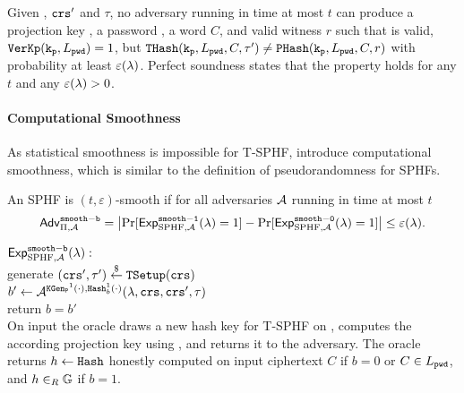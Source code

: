 \begin{definition}
Given \crs, $\mathtt{crs}'$ and $\tau$, no adversary running in time at most $t$ can produce a projection key \hp, a password \pwd, a word $C$, and valid witness $r$ such that \hp is valid, \ie $\mathtt{VerKp}(\mathtt{k_p},L_\mathtt{pwd})=1$, but $\mathtt{THash}(\mathtt{k_p},L_\mathtt{pwd},C,\tau')\not=\mathtt{PHash}(\mathtt{k_p},L_\mathtt{pwd},C,r)$ with probability at least $\varepsilon(\lambda)$.
Perfect soundness states that the property holds for any $t$ and any $\varepsilon(\lambda)>0$.
\eod
\end{definition} 

\paragraph{Computational Smoothness}
As statistical smoothness is impossible for \ac{T-SPHF}, \citet{Benhamouda2013} introduce computational smoothness, which is similar to the definition of pseudorandomness for \acp{SPHF}.

\begin{definition}
An \ac{SPHF} is $(t,\varepsilon)$-smooth if for all adversaries $\mathcal{A}$ running in time at most $t$
\[ \mathsf{Adv}_{\Pi, \mathcal{A}}^{\mathtt{smooth-b}} = \left|\Pr[\mathsf{Exp}^{\mathtt{smooth-1}}_{\text{SPHF},\mathcal{A}}(\lambda)=1] - \Pr[\mathsf{Exp}^{\mathtt{smooth-0}}_{\text{SPHF},\mathcal{A}}(\lambda)=1]\right| \leq \varepsilon(\lambda).\]

\noindent
$\mathsf{Exp}^{\mathtt{smooth-b}}_{\text{SPHF},\mathcal{A}}(\lambda):$ \\
\hspace*{2em} generate $(\mathtt{crs}',\tau')\stackrel{\$}{\gets}\mathtt{TSetup}(\mathtt{crs})$\\
\hspace*{2em} $b'\gets\mathcal{A}^{\mathtt{KGen_P}^1(\cdot), \mathtt{Hash}_b^1(\cdot)}(\lambda, \mathtt{crs}, \mathtt{crs}', \tau)$ \\
\hspace*{2em} return $b=b'$\\

\noindent
On input \pwd the \PKGen oracle draws a new hash key \hk for \ac{T-SPHF} on \Lpwd, computes the according projection key \hp using \PKGen, and returns it to the adversary.
The \Hash oracle returns $h\gets \mathtt{Hash}$ honestly computed on input ciphertext $C$ if $b=0$ or $C\in L_\mathtt{pwd}$, and $h\in_R \mathbb{G}$ if $b=1$.
\eod
\end{definition}


